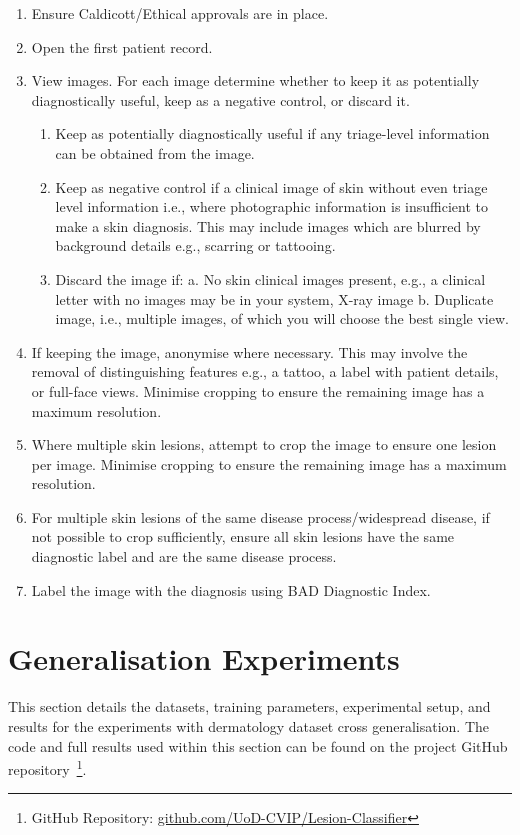 \begin{enumerate}
	\item Ensure Caldicott/Ethical approvals are in place.
	\item Open the first patient record. 
	\item View images. For each image determine whether to keep it as potentially diagnostically useful, keep as a negative control, or discard it.
	\begin{enumerate}
		\item Keep as potentially diagnostically useful if any triage-level information can be obtained from the image.
		\item Keep as negative control if a clinical image of skin without even triage level information i.e., where photographic information is insufficient to make a skin diagnosis. This may include images which are blurred by background details e.g., scarring or tattooing.
		\item Discard the image if: a. No skin clinical images present, e.g., a clinical letter with no images may be in your system, X-ray image b. Duplicate image, i.e., multiple images, of which you will choose the best single view.
	\end{enumerate}
	\item If keeping the image, anonymise where necessary. This may involve the removal of distinguishing features e.g., a tattoo, a label with patient details, or full-face views. Minimise cropping to ensure the remaining image has a maximum resolution. 
	\item Where multiple skin lesions, attempt to crop the image to ensure one lesion per image. Minimise cropping to ensure the remaining image has a maximum resolution.
	\item For multiple skin lesions of the same disease process/widespread disease, if not possible to crop sufficiently, ensure all skin lesions have the same diagnostic label and are the same disease process.
	\item Label the image with the diagnosis using BAD Diagnostic Index.
\end{enumerate}



\section{Generalisation Experiments}
\label{sec:generalisation_experiments}
This section details the datasets, training parameters, experimental setup, and results for the experiments with dermatology dataset cross generalisation. The code and full results used within this section can be found on the project GitHub repository~\footnote{GitHub Repository: \url{github.com/UoD-CVIP/Lesion-Classifier}}.

